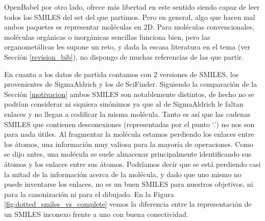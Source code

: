 OpenBabel por otro lado, ofrece más libertad en este sentido siendo capaz de leer todos los SMILES del set del que partimos. Pero en general, algo que hacen mal ambos paquetes es representar moléculas en 2D. Para moléculas convencionales, moléculas orgánicas o inorgánicas sencillas funciona bien, pero las organometálicas les supone un reto, y dada la escasa literatura en el tema (ver Sección \ref{revision_bib}), no dispongo de muchas referencias de las que partir.


En cuanto a los datos de partida contamos con 2 versiones de SMILES, los provenientes de SigmaAldrich y los de SciFinder. Siguiendo la comparación de la Sección \ref{motivacion} ambos SMILES son notablemente distintos, de hecho no se podrían considerar ni siquiera sinónimos ya que al de SigmaAldrich le faltan enlaces y no llegan a codificar la misma molécula. Tanto es así que las cadenas SMILES que contienen desconexiones (representadas por el punto `.') no nos son para nada útiles. Al fragmentar la molécula estamos perdiendo los enlaces entre los átomos, una información muy valiosa para la mayoría de operaciones. Como se dijo antes, una molécula se suele almacenar principalmente identificando sus átomos y los enlaces entre sus átomos. Podríamos decir que se está perdiendo casi la mitad de la información acerca de la molécula, y dado que uno mismo no puede inventarse los enlaces, no es un buen SMILES para nuestros objetivos, ni para la canonización ni para el dibujado. En la Figura \ref{fig:dotted_smiles_vs_complete} vemos la diferencia entre la representación de un SMILES inconexo frente a uno con buena conectividad.


